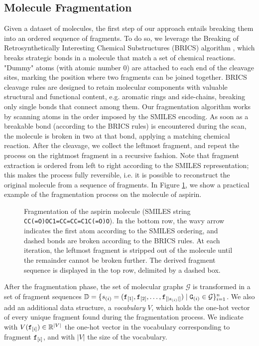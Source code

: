 \subsection{Molecule Fragmentation}
Given a dataset of molecules, the first step of our approach entails breaking them into an ordered sequence of fragments. To do so, we leverage the Breaking of Retrosynthetically Interesting Chemical Substructures (BRICS) algorithm \citep{degen2008brics}, which breaks strategic bonds in a molecule that match a set of chemical reactions. "Dummy" atoms (with atomic number 0) are attached to each end of the cleavage sites, marking the position where two fragments can be joined together. BRICS cleavage rules are designed to retain molecular components with valuable structural and functional content, e.g. aromatic rings and side-chains, breaking only single bonds that connect among them. Our fragmentation algorithm works by scanning atoms in the order imposed by the SMILES encoding. As soon as a breakable bond (according to the BRICS rules) is encountered during the scan, the molecule is broken in two at that bond, applying a matching chemical reaction. After the cleavage, we collect the leftmost fragment, and repeat the process on the rightmost fragment in a recursive fashion. Note that fragment extraction is ordered from left to right according to the SMILES representation; this makes the process fully reversible, i.e. it is possible to reconstruct the original molecule from a sequence of fragments. In Figure \ref{fig:fragmentation}, we show a practical example of the fragmentation process on the molecule of aspirin.
\begin{figure}[h!]
    \centering
    \resizebox{.98\textwidth}{!}{}
    \caption{Fragmentation of the aspirin molecule (SMILES string \texttt{CC(=O)OC1=CC=CC=C1C(=O)O}). In the bottom row, the wavy arrow indicates the first atom according to the SMILES ordering, and dashed bonds are broken according to the BRICS rules. At each iteration, the leftmost fragment is stripped out of the molecule until the remainder cannot be broken further. The derived fragment sequence is displayed in the top row, delimited by a dashed box.}
    \label{fig:fragmentation}
\end{figure}
After the fragmentation phase, the set of molecular graphs $\mathcal{G}$ is transformed in a set of fragment sequences $\Data = \{s_{(i)} = (\Graph{f}_{[1]}, \Graph{f}_{[2]}, \ldots, \Graph{f}_{[|s_{(i)}|]}) \mid \PatternGraph{G}{i} \in \mathcal{G}\}_{i=1}^n$. We also add an additional data structure, a \emph{vocabulary} $V$, which holds the one-hot vector of every unique fragment found during the fragmentation process. We indicate with $V(\mathtt{f}_{[i]}) \in \mathbb{R}^{|V|}$ the one-hot vector in the vocabulary corresponding to fragment $\mathtt{f}_{[i]}$, and with $|V|$ the size of the vocabulary.

